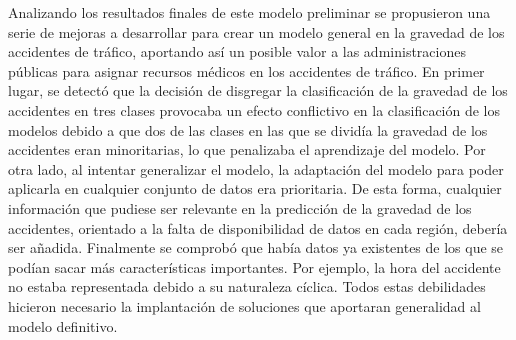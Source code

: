 

Analizando los resultados finales de este modelo preliminar se propusieron una serie de mejoras a desarrollar para crear un modelo general en la gravedad de los accidentes de tráfico, aportando así un posible valor a las administraciones públicas para asignar recursos médicos en los accidentes de tráfico. En primer lugar, se detectó que la decisión de disgregar la clasificación de la gravedad de los accidentes en tres clases provocaba un efecto conflictivo en la clasificación de los modelos debido a que dos de las clases en las que se dividía la gravedad de los accidentes eran minoritarias, lo que penalizaba el aprendizaje del modelo. Por otra lado, al intentar generalizar el modelo, la adaptación del modelo para poder aplicarla en cualquier conjunto de datos era prioritaria. De esta forma, cualquier información que pudiese ser relevante en la predicción de la gravedad de los accidentes, orientado a la falta de disponibilidad de datos en cada región, debería ser añadida. Finalmente se comprobó que había datos ya existentes de los que se podían sacar más características importantes. Por ejemplo, la hora del accidente no estaba representada debido a su naturaleza cíclica. Todos estas debilidades hicieron necesario la implantación de soluciones que aportaran generalidad al modelo definitivo.



